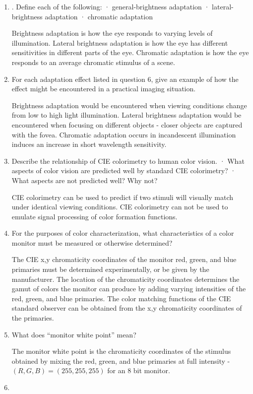 \begin{enumerate}
 \item
. Define each of the following: · general-brightness adaptation · lateral-brightness adaptation · chromatic adaptation
 \par Brightness adaptation is how the eye responds to varying levels of illumination.  Lateral brightness adaptation is how the eye has different sensitivities in different parts of the eye. Chromatic adaptation is how the eye responds to an average chromatic stimulus of a scene.
 \item
 For each adaptation effect listed in question 6, give an example of how the effect might be encountered in a practical imaging situation.
 \par Brightness adaptation would be encountered when viewing conditions change from low to high light illumination.  Lateral brightness adaptation would be encountered when focusing on different objects - closer objects are captured with the fovea. Chromatic adaptation occurs in incandescent illumination induces an increase in short wavelength sensitivity.
 \item
 Describe the relationship of CIE colorimetry to human color vision. · What aspects of color vision are predicted well by standard CIE colorimetry? · What aspects are not predicted well? Why not?
 \par CIE colorimetry can be used to predict if two stimuli will visually match under identical viewing conditions.  CIE colorimetry can not be used to emulate signal processing of color formation functions.
 \item
 For the purposes of color characterization, what characteristics of a color monitor must be measured or otherwise determined?
 \par The CIE x,y chromaticity coordinates of the monitor red, green, and blue primaries must be determined experimentally, or be given by the manufacturer.  The location of the chromaticity coordinates determines the gamut of colors the monitor can produce by adding varying intensities of the red, green, and blue primaries. The color matching functions of the CIE standard observer can be obtained from the x,y chromaticity coordinates of the primaries.
 \item
 What does “monitor white point” mean?
 \par The monitor white point is the chromaticity coordinates of the stimulus obtained by mixing the red, green, and blue primaries at full intensity - $ (R,G,B)=(255,255,255) $ for an 8 bit monitor.
 \item

\end{enumerate}

